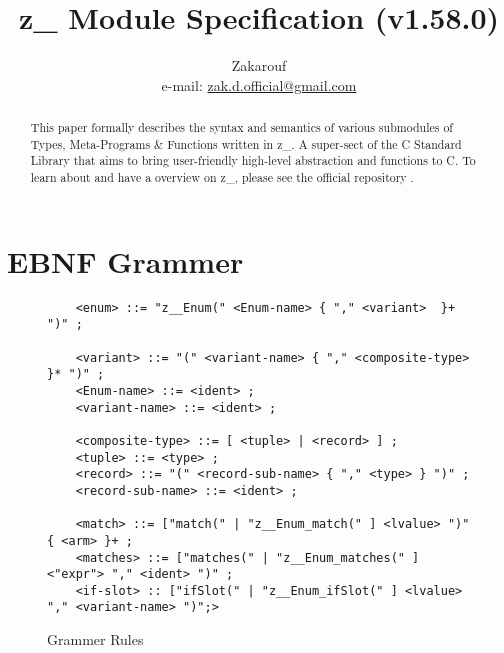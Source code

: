 \documentclass[12pt]{article}
\theoremstyle{break}
\begin{document}
\title{z\_ Module Specification (v1.58.0)}
\data{\today}
\author{Zakarouf \\ e-mail: \href{mailto:zak.d.official@gmail.com}{zak.d.official@gmail.com}}
\maketitle

\begin{abstract}
    This paper formally describes the syntax and semantics of various submodules of Types, Meta-Programs & Functions written in z\_. A super-sect of the C Standard Library that aims to bring user-friendly high-level abstraction and functions to C. To learn about and have a overview on z\_, please see the official repository \cite{z_}.
\end{abstract}

\tableofcontents

\newpage

\section{EBNF Grammer}
\begin{figure}[H]
    \caption{Grammer Rules}

\begin{verbatim}
    <enum> ::= "z__Enum(" <Enum-name> { "," <variant>  }+ ")" ;

    <variant> ::= "(" <variant-name> { "," <composite-type> }* ")" ;
    <Enum-name> ::= <ident> ;
    <variant-name> ::= <ident> ;

    <composite-type> ::= [ <tuple> | <record> ] ;
    <tuple> ::= <type> ;
    <record> ::= "(" <record-sub-name> { "," <type> } ")" ;
    <record-sub-name> ::= <ident> ;

    <match> ::= ["match(" | "z__Enum_match(" ] <lvalue> ")" { <arm> }+ ;
    <matches> ::= ["matches(" | "z__Enum_matches(" ] <"expr"> "," <ident> ")" ;
    <if-slot> :: ["ifSlot(" | "z__Enum_ifSlot(" ] <lvalue> "," <variant-name> ")";>
\end{verbatim}
\end{figure}
\end{document}
